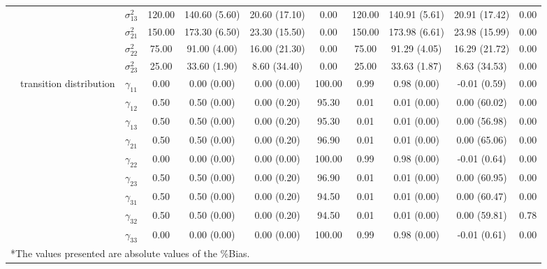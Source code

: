 \begin{table}[h]
{\begin{tabular}{ccccccccccc}
 &  & $\sigma^2_{13}$ & 120.00 & 140.60 (5.60) & 20.60 (17.10) & 0.00 & 120.00 & 140.91 (5.61) & 20.91 (17.42) & 0.00 \\
 &  & $\sigma^2_{21}$ & 150.00 & 173.30 (6.50) & 23.30 (15.50) & 0.00 & 150.00 & 173.98 (6.61) & 23.98 (15.99) & 0.00 \\
 &  & $\sigma^2_{22}$ & 75.00 & 91.00 (4.00) & 16.00 (21.30) & 0.00 & 75.00 & 91.29 (4.05) & 16.29 (21.72) & 0.00 \\
 &  & $\sigma^2_{23}$ & 25.00 & 33.60 (1.90) & 8.60 (34.40) & 0.00 & 25.00 & 33.63 (1.87) & 8.63 (34.53) & 0.00 \\
 & transition distribution & $\gamma_{11}$ & 0.00 & 0.00 (0.00) & 0.00 (0.00) & 100.00 & 0.99 & 0.98 (0.00) & -0.01 (0.59) & 0.00 \\
 & \multirow{8}{*}{} & $\gamma_{12}$ & 0.50 & 0.50 (0.00) & 0.00 (0.20) & 95.30 & 0.01 & 0.01 (0.00) & 0.00 (60.02) & 0.00 \\
 &  & $\gamma_{13}$ & 0.50 & 0.50 (0.00) & 0.00 (0.20) & 95.30 & 0.01 & 0.01 (0.00) & 0.00 (56.98) & 0.00 \\
 &  & $\gamma_{21}$ & 0.50 & 0.50 (0.00) & 0.00 (0.20) & 96.90 & 0.01 & 0.01 (0.00) & 0.00 (65.06) & 0.00 \\
 &  & $\gamma_{22}$ & 0.00 & 0.00 (0.00) & 0.00 (0.00) & 100.00 & 0.99 & 0.98 (0.00) & -0.01 (0.64) & 0.00 \\
 &  & $\gamma_{23}$ & 0.50 & 0.50 (0.00) & 0.00 (0.20) & 96.90 & 0.01 & 0.01 (0.00) & 0.00 (60.95) & 0.00 \\
 &  & $\gamma_{31}$ & 0.50 & 0.50 (0.00) & 0.00 (0.20) & 94.50 & 0.01 & 0.01 (0.00) & 0.00 (60.47) & 0.00 \\
 &  & $\gamma_{32}$ & 0.50 & 0.50 (0.00) & 0.00 (0.20) & 94.50 & 0.01 & 0.01 (0.00) & 0.00 (59.81) & 0.78 \\
 &  & $\gamma_{33}$ & 0.00 & 0.00 (0.00) & 0.00 (0.00) & 100.00 & 0.99 & 0.98 (0.00) & -0.01 (0.61) & 0.00 \\

\bottomrule 
\multicolumn{10}{l}{*The values presented are absolute values of the \%Bias.}
\end{tabular}}
\label{tgr2_4}
\end{table}

